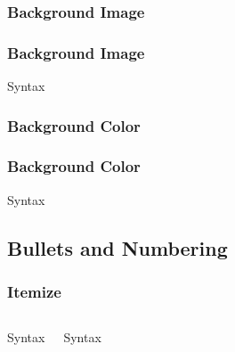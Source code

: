\documentclass{beamer}
\begin{document}
            \subsubsection{Background Image}
                \begin{frame}[shrink]
                \frametitle{Background Image}                    
                \transwipe
                    \begin{block}{Syntax}
                        
                    \end{block}
                \end{frame}

            \subsubsection{Background Color}
                    \begin{frame}[shrink]
                    \frametitle{Background Color}
                    \transboxin
                        \begin{block}{Syntax}
                            
                        \end{block}
                    \end{frame}

            \subsection{Bullets and Numbering}
                \begin{frame}
                \frametitle{Itemize}
                \transboxout
                    \begin{columns}
                        \begin{block}{Syntax}
                            
                        \end{block}
            
                        \begin{block}{Syntax}
                            
                        \end{block}
                    \end{columns}
                \end{frame}
\end{document}
